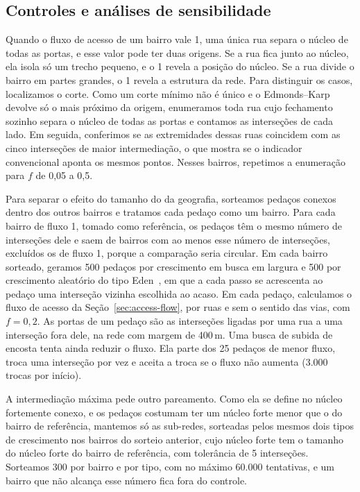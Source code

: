 \subsection{Controles e análises de sensibilidade}
\label{sec:controls}

Quando o fluxo de acesso de um bairro vale 1, uma única rua separa o núcleo de
todas as portas, e esse valor pode ter duas origens. Se a rua fica junto ao
núcleo, ela isola só um trecho pequeno, e o 1 revela a posição do núcleo. Se a
rua divide o bairro em partes grandes, o 1 revela a estrutura da rede. Para
distinguir os casos, localizamos o corte. Como um corte mínimo não é único e o
Edmonds--Karp devolve só o mais próximo da origem, enumeramos toda rua cujo
fechamento sozinho separa o núcleo de todas as portas e contamos as interseções
de cada lado. Em seguida, conferimos se as extremidades dessas ruas coincidem
com as cinco interseções de maior intermediação, o que mostra se o indicador
convencional aponta os mesmos pontos. Nesses bairros, repetimos a enumeração
para $f$ de 0,05 a 0,5.

Para separar o efeito do tamanho do da geografia, sorteamos pedaços conexos
dentro dos outros bairros e tratamos cada pedaço como um bairro. Para cada
bairro de fluxo 1, tomado como referência, os pedaços têm o mesmo número de
interseções dele e saem de bairros com ao menos esse número de interseções,
excluídos os de fluxo 1, porque a comparação seria circular. Em cada bairro
sorteado, geramos 500 pedaços por crescimento em busca em largura e 500 por
crescimento aleatório do tipo Eden~\cite{eden1961}, em que a cada passo se
acrescenta ao pedaço uma interseção vizinha escolhida ao acaso. Em cada pedaço,
calculamos o fluxo de acesso da Seção~\ref{sec:access-flow}, por ruas e sem o
sentido das vias, com $f=0{,}2$. As portas de um pedaço são as interseções
ligadas por uma rua a uma interseção fora dele, na rede com margem de 400\,m.
Uma busca de subida de encosta tenta ainda reduzir o fluxo. Ela parte dos 25
pedaços de menor fluxo, troca uma interseção por vez e aceita a troca se o
fluxo não aumenta (3.000 trocas por início).

A intermediação máxima pede outro pareamento. Como ela se define no núcleo
fortemente conexo, e os pedaços costumam ter um núcleo forte menor que o do
bairro de referência, mantemos só as sub-redes, sorteadas pelos mesmos dois
tipos de crescimento nos bairros do sorteio anterior, cujo núcleo forte tem o
tamanho do núcleo forte do bairro de referência, com tolerância de 5
interseções. Sorteamos 300 por bairro e por tipo, com no máximo 60.000
tentativas, e um bairro que não alcança esse número fica fora do controle.

